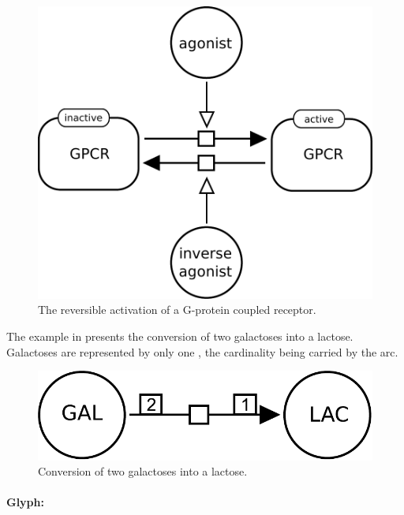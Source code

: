 \begin{figure}[H]
  \centering
  \includegraphics[scale = 0.3]{examples/process-modulated}
  \caption{The reversible activation of a G-protein coupled receptor.}
  \label{fig:trans-mod}
\end{figure}

The example in  presents the conversion of two galactoses into a lactose.  Galactoses are represented by only one , the cardinality being carried by the  arc.

\begin{figure}[H]
  \centering
  \includegraphics[scale = 0.3]{examples/process-dimerisation}
  \caption{Conversion of two galactoses into a lactose.}
  \label{fig:trans-dim}
\end{figure}



\paragraph{Glyph: }\label{sec:omitted}

